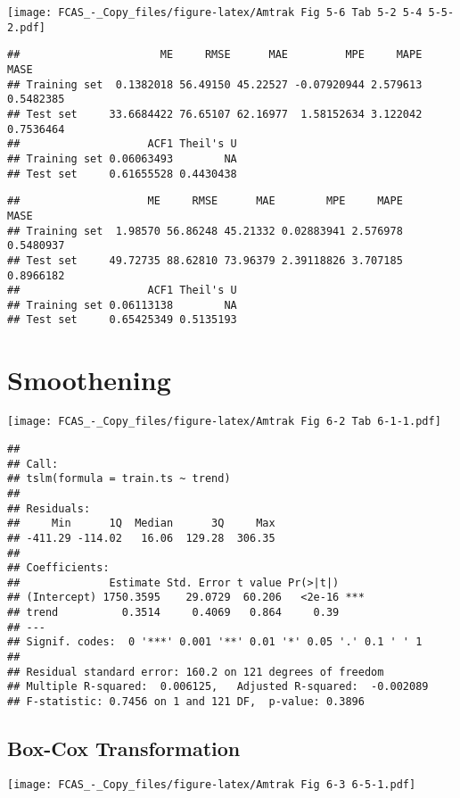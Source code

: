 \documentclass[]{article}
\begin{document}
\texttt{[image: FCAS\_-\_Copy\_files/figure-latex/Amtrak Fig 5-6 Tab 5-2 5-4 5-5-2.pdf]}

\begin{verbatim}
##                      ME     RMSE      MAE         MPE     MAPE      MASE
## Training set  0.1382018 56.49150 45.22527 -0.07920944 2.579613 0.5482385
## Test set     33.6684422 76.65107 62.16977  1.58152634 3.122042 0.7536464
##                    ACF1 Theil's U
## Training set 0.06063493        NA
## Test set     0.61655528 0.4430438
\end{verbatim}

\begin{verbatim}
##                    ME     RMSE      MAE        MPE     MAPE      MASE
## Training set  1.98570 56.86248 45.21332 0.02883941 2.576978 0.5480937
## Test set     49.72735 88.62810 73.96379 2.39118826 3.707185 0.8966182
##                    ACF1 Theil's U
## Training set 0.06113138        NA
## Test set     0.65425349 0.5135193
\end{verbatim}

\section{Smoothening}\label{smoothening-1}

\texttt{[image: FCAS\_-\_Copy\_files/figure-latex/Amtrak Fig 6-2 Tab 6-1-1.pdf]}

\begin{verbatim}
## 
## Call:
## tslm(formula = train.ts ~ trend)
## 
## Residuals:
##     Min      1Q  Median      3Q     Max 
## -411.29 -114.02   16.06  129.28  306.35 
## 
## Coefficients:
##              Estimate Std. Error t value Pr(>|t|)    
## (Intercept) 1750.3595    29.0729  60.206   <2e-16 ***
## trend          0.3514     0.4069   0.864     0.39    
## ---
## Signif. codes:  0 '***' 0.001 '**' 0.01 '*' 0.05 '.' 0.1 ' ' 1
## 
## Residual standard error: 160.2 on 121 degrees of freedom
## Multiple R-squared:  0.006125,   Adjusted R-squared:  -0.002089 
## F-statistic: 0.7456 on 1 and 121 DF,  p-value: 0.3896
\end{verbatim}

\subsection{Box-Cox Transformation}\label{box-cox-transformation}

\texttt{[image: FCAS\_-\_Copy\_files/figure-latex/Amtrak Fig 6-3 6-5-1.pdf]}
\end{document}
